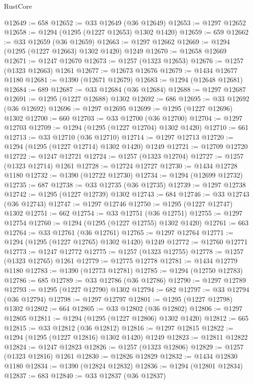 \begin{lexlean}{RustCore}
\begin{coremodule}
@12649 := 658
@12652 := @33 @12649 (@36 @12649)
@12653 := @1297 @12652
@12658 := @1294 (@1295 (@1227 @12653) @1302 @1420)
@12659 := 659
@12662 := @33 @12659 (@36 @12659)
@12663 := @1297 @12662
@12669 := @1294 (@1295 (@1227 @12663) @1302 @1420) @1249
@12670 := @12658 @12669
@12671 := @1247 @12670
@12673 := @1257 (@1323 @12653)
@12676 := @1257 (@1323 @12663) @1261
@12677 := @12673 @12676
@12679 := @1434 @12677 @1180
@12681 := @1390 (@12671 @12679)
@12683 := @1294 (@12648 @12681)
@12684 := 689
@12687 := @33 @12684 (@36 @12684)
@12688 := @1297 @12687
@12691 := @1295 (@1227 @12688) @1302
@12692 := 686
@12695 := @33 @12692 (@36 @12692)
@12696 := @1297 @12695
@12699 := @1295 (@1227 @12696) @1302
@12700 := 660
@12703 := @33 @12700 (@36 @12700)
@12704 := @1297 @12703
@12709 := @1294 (@1295 (@1227 @12704) @1302 @1420)
@12710 := 661
@12713 := @33 @12710 (@36 @12710)
@12714 := @1297 @12713
@12720 := @1294 (@1295 (@1227 @12714) @1302 @1420) @1249
@12721 := @12709 @12720
@12722 := @1247 @12721
@12724 := @1257 (@1323 @12704)
@12727 := @1257 (@1323 @12714) @1261
@12728 := @12724 @12727
@12730 := @1434 @12728 @1180
@12732 := @1390 (@12722 @12730)
@12734 := @1294 (@12699 @12732)
@12735 := 687
@12738 := @33 @12735 (@36 @12735)
@12739 := @1297 @12738
@12742 := @1295 (@1227 @12739) @1302
@12743 := 684
@12746 := @33 @12743 (@36 @12743)
@12747 := @1297 @12746
@12750 := @1295 (@1227 @12747) @1302
@12751 := 662
@12754 := @33 @12751 (@36 @12751)
@12755 := @1297 @12754
@12760 := @1294 (@1295 (@1227 @12755) @1302 @1420)
@12761 := 663
@12764 := @33 @12761 (@36 @12761)
@12765 := @1297 @12764
@12771 := @1294 (@1295 (@1227 @12765) @1302 @1420) @1249
@12772 := @12760 @12771
@12773 := @1247 @12772
@12775 := @1257 (@1323 @12755)
@12778 := @1257 (@1323 @12765) @1261
@12779 := @12775 @12778
@12781 := @1434 @12779 @1180
@12783 := @1390 (@12773 @12781)
@12785 := @1294 (@12750 @12783)
@12786 := 685
@12789 := @33 @12786 (@36 @12786)
@12790 := @1297 @12789
@12793 := @1295 (@1227 @12790) @1302
@12794 := 682
@12797 := @33 @12794 (@36 @12794)
@12798 := @1297 @12797
@12801 := @1295 (@1227 @12798) @1302
@12802 := 664
@12805 := @33 @12802 (@36 @12802)
@12806 := @1297 @12805
@12811 := @1294 (@1295 (@1227 @12806) @1302 @1420)
@12812 := 665
@12815 := @33 @12812 (@36 @12812)
@12816 := @1297 @12815
@12822 := @1294 (@1295 (@1227 @12816) @1302 @1420) @1249
@12823 := @12811 @12822
@12824 := @1247 @12823
@12826 := @1257 (@1323 @12806)
@12829 := @1257 (@1323 @12816) @1261
@12830 := @12826 @12829
@12832 := @1434 @12830 @1180
@12834 := @1390 (@12824 @12832)
@12836 := @1294 (@12801 @12834)
@12837 := 683
@12840 := @33 @12837 (@36 @12837)

\end{coremodule}
\end{lexlean}
